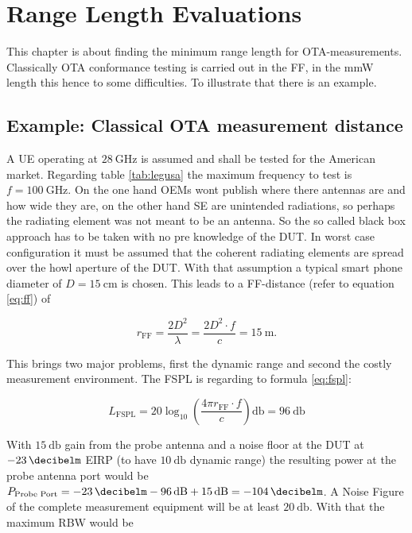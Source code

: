 \chapter{Range Length Evaluations}

This chapter is about finding the minimum range length for \ac{OTA}-measurements. Classically \ac{OTA} conformance testing is carried out in the \ac{FF}, in the \ac{mmW} length this hence to some difficulties. To illustrate that there is an example.

\section{Example: Classical OTA measurement distance}

A \ac{UE} operating at $\SI{28}{\giga\hertz}$ is assumed and shall be tested for the American market. Regarding table \ref{tab:legusa} the maximum frequency to test is $f = \SI{100}{\giga\hertz}$. On the one hand \acp{OEM} wont publish where there antennas are and how wide they are, on the other hand \ac{SE} are unintended radiations, so perhaps the radiating element was not meant to be an antenna. So the so called black box approach has to be taken with no pre knowledge of the \ac{DUT}. In worst case configuration it must be assumed that the coherent radiating elements are spread over the howl aperture of the \ac{DUT}. With that assumption a typical smart phone diameter of $D=\SI{15}{\centi\meter}$ is chosen. This leads to a \ac{FF}-distance (refer to equation \ref{eq:ff}) of 

\begin{equation}
r_{\text{FF}} = \frac{2D^2}{\lambda} = \frac{2D^2\cdot f}{c} = \SI{15}{\meter}.
\end{equation}

This brings two major problems, first the dynamic range and second the costly measurement environment. The \ac{FSPL} is regarding to formula \ref{eq:fspl}:

\begin{equation}
L_{\text{FSPL}} = 20\log_{10}\left(\frac{4\pi r_{\text{FF}} \cdot f}{c}\right)\si{\decibel} = \SI{96}{\decibel}
\end{equation}

With $\SI{15}{\decibel}$ gain from the probe antenna and a noise floor at the \ac{DUT} at $\SI{-23}{\decibelm}$ \ac{EIRP} (to have $\SI{10}{\decibel}$ dynamic range) the resulting power at the probe antenna port would be $P_{\text{Probe Port}} = \SI{-23}{\decibelm}-\SI{96}{\decibel}+\SI{15}{\decibel}=\SI{-104}{\decibelm}$. A Noise Figure of the complete measurement equipment will be at least $\SI{20}{\decibel}$. With that the maximum \ac{RBW} would be 

